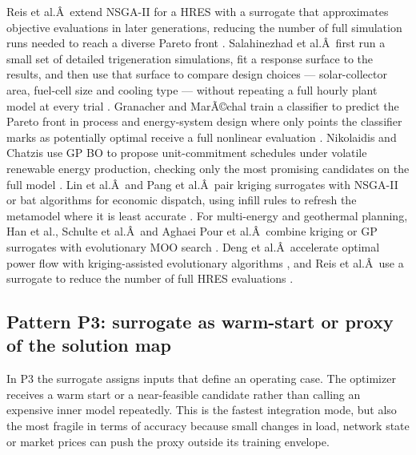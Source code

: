 Reis et al.Â~extend NSGA-II for a HRES with a surrogate that approximates
objective evaluations in later generations, reducing the number of full
simulation runs needed to reach a diverse Pareto front \cite{Reis2025}.
Salahinezhad et al.Â~first run a small set of detailed trigeneration
simulations, fit a response surface to the results, and then use that
surface to compare design choices --- solar-collector area, fuel-cell
size and cooling type --- without repeating a full hourly plant model at
every trial \cite{Salahinezhad2025}. Granacher and MarÃ©chal train a
classifier to predict the Pareto front in process and energy-system
design where only points the classifier marks as potentially optimal
receive a full nonlinear evaluation \cite{Granacher20221573}. Nikolaidis and
Chatzis use GP BO to propose unit-commitment schedules under volatile
renewable energy production, checking only the most promising candidates
on the full model \cite{Nikolaidis2021}. Lin et al.Â~and Pang et al.Â~pair
kriging surrogates with NSGA-II or bat algorithms for economic dispatch,
using infill rules to refresh the metamodel where it is least accurate
\cite{Lin2023,Pang2023}. For multi-energy and geothermal planning, Han et
al., Schulte et al.Â~and
Aghaei Pour et al.Â~combine kriging or GP surrogates with evolutionary
MOO search \cite{Han2018622,Schulte2020,Aghaei Pour2022303}. Deng et
al.Â~accelerate optimal power flow with kriging-assisted evolutionary
algorithms \cite{Deng2020831}, and Reis et al.Â~use a surrogate to reduce
the number of full HRES evaluations \cite{Reis2025}.

\subsection{Pattern P3: surrogate as warm-start or proxy of the solution map}
\label{sec:int:warmstart}

In P3 the surrogate assigns inputs that define an operating case. The
optimizer receives a warm start or a near-feasible candidate rather than
calling an expensive inner model repeatedly. This is the fastest
integration mode, but also the most fragile in terms of accuracy because
small changes in load, network state or market prices can push the proxy
outside its training envelope.

